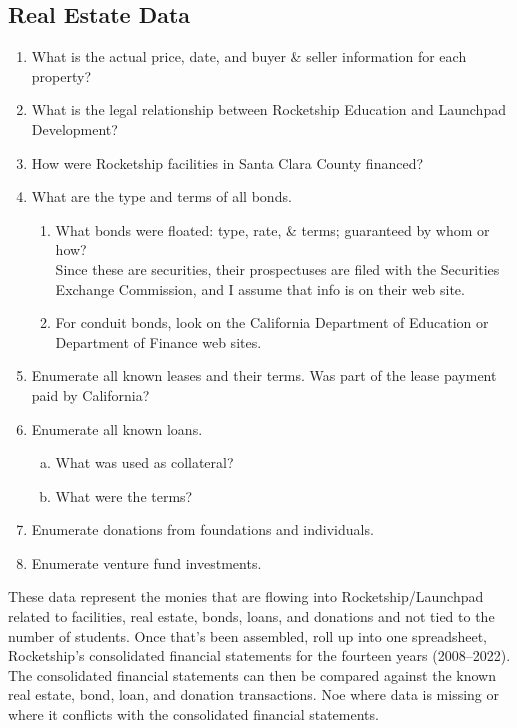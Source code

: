 \subsection{Real Estate Data}\label{sec:real-estate-data}\indent
\begin{enumerate}
  \item What is the actual price, date, and buyer \& seller information for each property?
  \item What is the legal relationship between Rocketship Education and Launchpad Development?
  \item How were Rocketship facilities in Santa Clara County financed?
  \item What are the type and terms of all bonds.
  \begin{enumerate}
    \item What bonds were floated: type, rate, \& terms; guaranteed by whom or how? \\
    \noindent Since these are securities, their prospectuses are filed with the Securities Exchange Commission, and I assume that info is on their web site.
    \item For conduit bonds, look on the California Department of Education or Department of Finance web sites.
  \end{enumerate}
  \item Enumerate all known leases and their terms. Was part of the lease payment paid by California?
  \item Enumerate all known loans.
  \begin{enumerate}[a.]
    \item What was used as collateral? 
    \item What were the terms?
  \end{enumerate}    
  \item Enumerate donations from foundations and individuals.
  \item Enumerate venture fund investments.
\end{enumerate}

These data represent the monies that are flowing into Rocketship/Launchpad related to facilities, real estate, bonds, loans, and donations and not tied to the number of students. Once that's been assembled, roll up into one spreadsheet, Rocketship's consolidated financial statements for the fourteen years (2008--2022). The consolidated financial statements can then be compared against the known real estate, bond, loan, and donation transactions. Noe where data is missing or where it conflicts with the consolidated financial statements.

